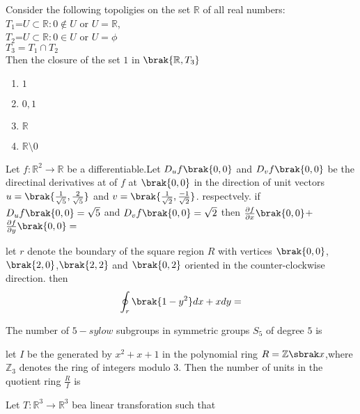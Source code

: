 \iffalse
\chapter{2008}
\author{AI24BTECH11018}
\section{ee}
\fi

\item Consider the following topoligies on the set $\mathbb{R}$ of all real numbers:\\
$T_1$={$U \subset \mathbb{R} :0 \notin U$ or $U=\mathbb{R}$},\\
$T_2$={$U \subset \mathbb{R} :0 \in U$ or $U=\phi$ }\\
$T_3=T_1 \cap T_2$\\
Then the closure of the set ${1}$ in $\brak{\mathbb{R},T_3}$
\begin{enumerate}
    \item ${1}$
    \item $0,1$
    \item ${\mathbb{R}}$
    \item $\mathbb{R} \texttt{\textbackslash} {0}$
\end{enumerate}
\item Let $f:{\mathbb{R}}^2\rightarrow \mathbb{R}$ be a differentiable.Let $D_uf\brak{0,0}$ and $D_vf\brak{0,0}$ be the directinal derivatives at of $f$ at $\brak{0,0}$ in the direction of unit vectors $u=\brak{\frac{1}{\sqrt{5}},\frac{2}{\sqrt{5}}}$ and $v=\brak{\frac{1}{\sqrt{2}},\frac{-1}{\sqrt{2}}}$. respectvely. if $D_uf\brak{0,0}=\sqrt{5}$ and $D_vf\brak{0,0}=\sqrt{2}$ then $\frac{\partial f}{\partial x}\brak{0,0}$+$\frac{\partial f}{\partial y}\brak{0,0}=$
\item let $r$ denote the boundary of the square region $R$ with vertices $\brak{0,0}$,$\brak{2,0}$,$\brak{2,2}$ and $\brak{0,2}$ oriented in the counter-clockwise direction. then \begin{equation}
\oint_r \brak{1-y^2}dx+x dy=
\end{equation}
\item The number of $5-sylow$ subgroups in symmetric groups $S_5$ of degree $5$ is 
\item let $I$ be the generated by $x^2+x+1$ in the polynomial ring $R=\mathbb{Z} \sbrak x$,where $\mathbb{Z}_3$ denotes the ring of integers modulo $3$. Then the number of units in the quotient ring $\frac{R}{I}$ is
\item Let $T:{\mathbb{R}}^3 \rightarrow {\mathbb{R}}^3$ bea linear transforation such that\\
